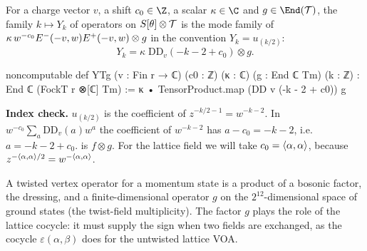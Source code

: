 \begin{definition}\label{ch08:def:YTg}
For a charge vector $v$, a shift $c_0\in\Z$, a scalar $\kappa\in\C$ and $g\in\End(\cheightT)$, the
family $k\mapsto Y_k$ of operators on $S[\theta]\otimes\mathcal{T}$ is the mode family of
$\kappa\,w^{-c_0}E^{-}(-v,w)E^{+}(-v,w)\otimes g$ in the convention $Y_k=u_{(k/2)}$:
\begin{equation*}
  Y_k=\kappa\;\mathrm{DD}_v(-k-2+c_0)\otimes g .
\end{equation*}
\end{definition}
\begin{leancode}
noncomputable def YTg (v : Fin r → ℂ) (c0 : ℤ) (κ : ℂ) (g : End ℂ Tm) (k : ℤ) :
    End ℂ (FockT r ⊗[ℂ] Tm) :=
  κ • TensorProduct.map (DD v (-k - 2 + c0)) g
\end{leancode}
\begin{dictionary}
\textbf{Index check.}  $u_{(k/2)}$ is the coefficient of $z^{-k/2-1}=w^{-k-2}$.  In
$w^{-c_0}\sum_a\mathrm{DD}_v(a)w^a$ the coefficient of $w^{-k-2}$ has $a-c_0=-k-2$, i.e.
$a=-k-2+c_0$.   is $f\otimes g$.  For the lattice field we will take
$c_0=\langle \alpha,\alpha\rangle$, because $z^{-\langle \alpha,\alpha\rangle/2}=w^{-\langle \alpha,\alpha\rangle}$.
\end{dictionary}

\begin{physics}
A twisted vertex operator for a momentum state is a product of a bosonic factor, the dressing, and a finite-dimensional operator $g$ on the $2^{12}$-dimensional space of ground states (the twist-field multiplicity). The factor $g$ plays the role of the lattice cocycle: it must supply the sign when two fields are exchanged, as the cocycle $\varepsilon(\alpha,\beta)$ does for the untwisted lattice VOA.
\end{physics}

